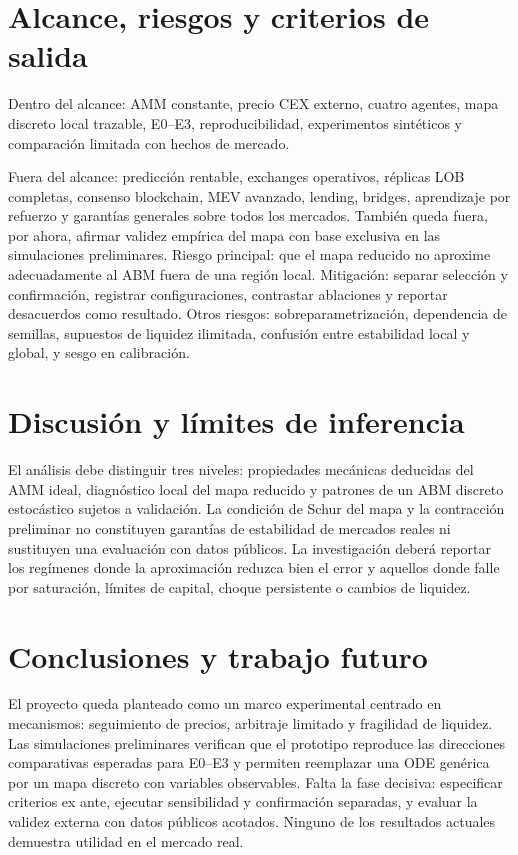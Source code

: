 \section{Alcance, riesgos y criterios de salida}

Dentro del alcance: AMM constante, precio CEX externo, cuatro agentes, mapa discreto
local trazable, E0--E3, reproducibilidad, experimentos sintéticos y comparación limitada
con hechos de mercado.

Fuera del alcance: predicción rentable, exchanges operativos, réplicas LOB completas,
consenso blockchain, MEV avanzado, lending, bridges, aprendizaje por refuerzo y
garantías generales sobre todos los mercados. También queda fuera, por ahora, afirmar
validez empírica del mapa con base exclusiva en las simulaciones preliminares. Riesgo
principal: que el mapa reducido no aproxime adecuadamente al ABM fuera de una región
local. Mitigación: separar selección y confirmación, registrar configuraciones,
contrastar ablaciones y reportar desacuerdos como resultado. Otros riesgos:
sobreparametrización, dependencia de semillas, supuestos de liquidez ilimitada,
confusión entre estabilidad local y global, y sesgo en calibración.

\section{Discusión y límites de inferencia}

El análisis debe distinguir tres niveles: propiedades mecánicas deducidas del AMM ideal,
diagnóstico local del mapa reducido y patrones de un ABM discreto estocástico sujetos a
validación. La condición de Schur del mapa y la contracción preliminar no constituyen
garantías de estabilidad de mercados reales ni sustituyen una evaluación con datos
públicos. La investigación deberá reportar los regímenes donde la aproximación reduzca
bien el error y aquellos donde falle por saturación, límites de capital, choque
persistente o cambios de liquidez.

\section{Conclusiones y trabajo futuro}

El proyecto queda planteado como un marco experimental centrado en mecanismos:
seguimiento de precios, arbitraje limitado y fragilidad de liquidez. Las simulaciones
preliminares verifican que el prototipo reproduce las direcciones comparativas
esperadas para E0--E3 y permiten reemplazar una ODE genérica por un mapa discreto con
variables observables. Falta la fase decisiva: especificar criterios ex ante, ejecutar
sensibilidad y confirmación separadas, y evaluar la validez externa con datos públicos
acotados. Ninguno de los resultados actuales demuestra utilidad en el mercado real.
